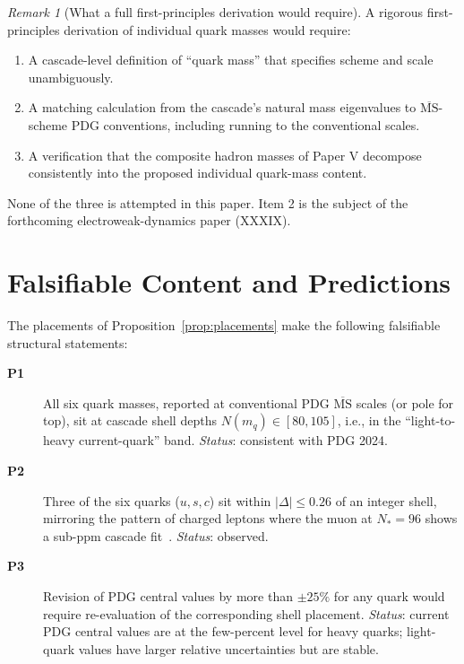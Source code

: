 \documentclass[12pt]{article}
\theoremstyle{definition}
\theoremstyle{remark}
\newtheorem{remark}[theorem]{Remark}
\newcommand{\MSbar}{\overline{\mathrm{MS}}}
\begin{document}
\begin{remark}[What a full first-principles derivation would require]
A rigorous first-principles derivation of individual quark masses would require:
\begin{enumerate}
\item A cascade-level definition of ``quark mass'' that specifies scheme and scale unambiguously.
\item A matching calculation from the cascade's natural mass eigenvalues to $\MSbar$-scheme PDG conventions, including running to the conventional scales.
\item A verification that the composite hadron masses of Paper V decompose consistently into the proposed individual quark-mass content.
\end{enumerate}
None of the three is attempted in this paper. Item 2 is the subject of the forthcoming electroweak-dynamics paper (XXXIX).
\end{remark}

\section{Falsifiable Content and Predictions}\label{sec:predictions}

The placements of Proposition~\ref{prop:placements} make the following falsifiable structural statements:

\begin{description}
\item[\textbf{P1}] All six quark masses, reported at conventional PDG $\MSbar$ scales (or pole for top), sit at cascade shell depths $N(m_q) \in [80, 105]$, i.e., in the ``light-to-heavy current-quark'' band. \emph{Status}: consistent with PDG 2024.
\item[\textbf{P2}] Three of the six quarks ($u, s, c$) sit within $|\Delta| \le 0.26$ of an integer shell, mirroring the pattern of charged leptons where the muon at $N_* = 96$ shows a sub-ppm cascade fit~\citep{SmartV}. \emph{Status}: observed.
\item[\textbf{P3}] Revision of PDG central values by more than $\pm 25\%$ for any quark would require re-evaluation of the corresponding shell placement. \emph{Status}: current PDG central values are at the few-percent level for heavy quarks; light-quark values have larger relative uncertainties but are stable.
\end{description}
\end{document}
